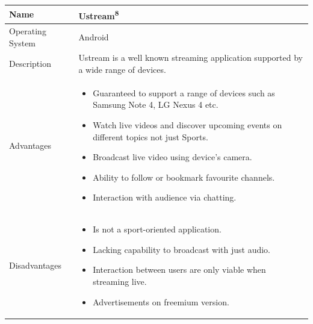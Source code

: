 \documentclass{article}
\begin{document}
\begin{flushleft}
\begin{longtable}{| p{2.2cm} | p{9cm} |}
\hline
Name & Ustream\textsuperscript{8}\\
\hline
Operating System & Android\\
\hline
Description & Ustream is a well known streaming application supported by a wide range of devices.\\
\hline
Advantages &
\begin{itemize}
	\item Guaranteed to support a range of devices such as Samsung Note 4, LG Nexus 4 etc.
	\item Watch live videos and discover upcoming events on different topics not just Sports.
	\item Broadcast live video using device's camera.
	\item Ability to follow or bookmark favourite channels.
	\item Interaction with audience via chatting.
\end{itemize}\\
\hline
Disadvantages &
\begin{itemize}
	\item Is not a sport-oriented application.
	\item Lacking capability to broadcast with just audio.
	\item Interaction between users are only viable when streaming live.
	\item Advertisements on freemium version.
\end{itemize}\\
\hline
\end{longtable}


\end{flushleft}
\end{document}
